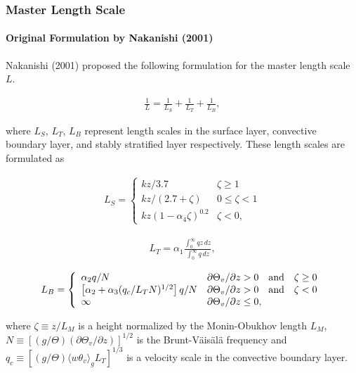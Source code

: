 \hypertarget{master-length-scale}{%
\subsubsection{Master Length Scale}\label{master-length-scale}}

\hypertarget{original-formulation-by-nakanishi-2001}{%
\paragraph{Original Formulation by Nakanishi
(2001)}\label{original-formulation-by-nakanishi-2001}}

Nakanishi (2001) proposed the following formulation for the master
length scale \(L\).

\begin{eqnarray}\frac{1}{L}=\frac{1}{L_S}+\frac{1}{L_T}+\frac{1}{L_B} \label{p-dif.1}, \end{eqnarray}

where \(L_S\), \(L_T\), \(L_B\) represent length scales in the surface
layer, convective boundary layer, and stably stratified layer
respectively. These length scales are formulated as

\begin{eqnarray}
L_S=\left\{
    \begin{array}{lr}
      kz/3.7 &\zeta\ge 1\\
      kz/(2.7+\zeta) &0\le\zeta< 1\\
      kz(1-\alpha_4\zeta)^{0.2} &\zeta< 0,
    \end{array}
  \right.
\end{eqnarray}

\begin{eqnarray}L_T=\alpha_1\frac{\displaystyle \int_0^\infty{qz}\,dz}{\displaystyle \int_0^\infty{q}\,dz},\end{eqnarray}

\begin{eqnarray}
L_B=\left\{
    \begin{array}{ll}
      \alpha_2 q/N &\partial\Theta_v/\partial z> 0 \quad\rm{and}\quad\zeta\ge 0\\
      \left[\alpha_2+\alpha_3(q_c/L_TN)^{1/2}\right]q/N &\partial\Theta_v/\partial z> 0 \quad\rm{and}\quad\zeta< 0\\
      \infty &\partial\Theta_v/\partial z\le 0,
    \end{array}
  \right.
\end{eqnarray}

where \(\zeta\equiv z/L_M\) is a height normalized by the Monin-Obukhov
length \(L_M\),
\(N\equiv\left[(g/\Theta)(\partial\Theta_v/\partial z)\right]^{1/2}\) is
the Brunt-Väisälä frequency and
\(q_c\equiv [(g/\Theta)\langle w\theta_v \rangle_gL_T]^{1/3}\) is a
velocity scale in the convective boundary layer.

